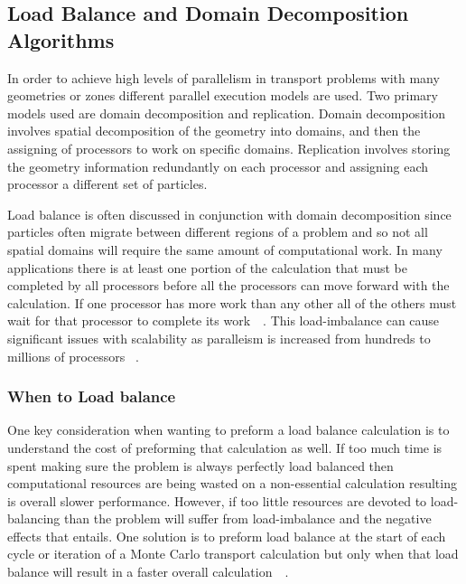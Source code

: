 \subsection{Load Balance and Domain Decomposition Algorithms}

In order to achieve high levels of parallelism in transport problems with many geometries or zones different parallel execution models are used.
%
Two primary models used are domain decomposition and replication.
%
Domain decomposition involves spatial decomposition of the geometry into domains, and then the assigning of processors to work on specific domains.
%
Replication involves storing the geometry information redundantly on each processor and assigning each processor a different set of particles.
~\cite{o2005dynamic}
~\cite{procassini2005load}

Load balance is often discussed in conjunction with domain decomposition since particles often migrate between different regions of a problem and so not all spatial domains will require the same amount of computational work.
%
In many applications there is at least one portion of the calculation that must be completed by all processors before all the processors can move forward with the calculation.
%
If one processor has more work than any other all of the others must wait for that processor to complete its work~\cite{o2005dynamic}~\cite{procassini2005load}.
%
This load-imbalance can cause significant issues with scalability as paralleism is increased from hundreds to millions of processors ~\cite{o2013scalable}.
%

\subsubsection*{When to Load balance}

%
One key consideration when wanting to preform a load balance calculation is to understand the cost of preforming that calculation as well.
%
If too much time is spent making sure the problem is always perfectly load balanced then computational resources are being wasted on a non-essential calculation resulting is overall slower performance.
%
However, if too little resources are devoted to load-balancing than the problem will suffer from load-imbalance and the negative effects that entails.
%
One solution is to preform load balance at the start of each cycle or iteration of a Monte Carlo transport calculation but only when that load balance will result in a faster overall calculation~\cite{o2005dynamic}~\cite{procassini2005load}.
%

